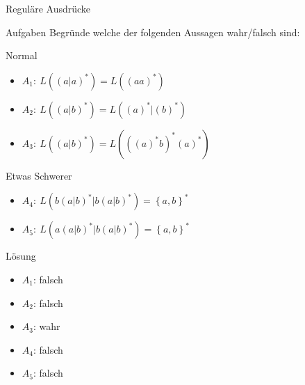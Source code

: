 {
\begin{frame}{Reguläre Ausdrücke}
    \begin{alertblock}{Aufgaben}
        Begründe welche der folgenden Aussagen wahr/falsch sind:
    \end{alertblock}
    \begin{block}{Normal}
        \begin{itemize}
            \item $A_1:\ L\left(\left(a|a\right)^*\right) = L\left(\left(aa\right)^*\right)$
            \item $A_2:\ L\left(\left(a|b\right)^*\right) = L\left(\left(a\right)^*|\left(b\right)^*\right)$
            \item $A_3:\ L\left(\left(a|b\right)^*\right) = L\left(\left(\left(a\right)^*b\right)^*\left(a\right)^*\right)$
        \end{itemize}
    \end{block}
    \begin{block}{Etwas Schwerer}
        \begin{itemize}
            \item $A_4:\ L\left(b\left(a|b\right)^*|b\left(a|b\right)^*\right) = \left\{a,b\right\}^*$
            \item $A_5:\ L\left(a\left(a|b\right)^*|b\left(a|b\right)^*\right) = \left\{a,b\right\}^*$
        \end{itemize}
    \end{block}
\end{frame}
}

{
\begin{frame}{Lösung}
    \begin{itemize}[<+- | alert@+>]
        \item $A_1$: falsch
        \item $A_2$: falsch
        \item $A_3$: wahr
        \item $A_4$: falsch
        \item $A_5$: falsch
    \end{itemize}
\end{frame}
}

%
%

